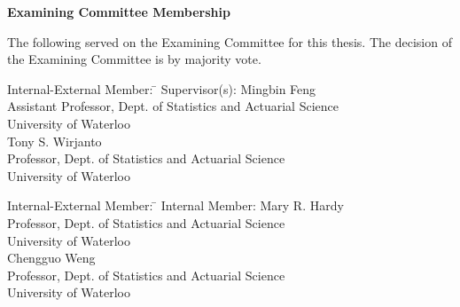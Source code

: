 \cleardoublepage %

 
\begin{center}\textbf{Examining Committee Membership}\end{center}
  \noindent
The following served on the Examining Committee for this thesis. The decision of the Examining Committee is by majority vote.
  \bigskip
  
  
  \noindent
\begin{tabbing}
Internal-External Member: \=  \kill %
Supervisor(s): \> Mingbin Feng \\
\> Assistant Professor, Dept. of Statistics and Actuarial Science\\
\> University of Waterloo \\[1cm]
\> Tony S. Wirjanto \\
\> Professor, Dept. of Statistics and Actuarial Science \\
\> University of Waterloo \\
\end{tabbing}
  \bigskip
  
  \noindent
  \begin{tabbing}
Internal-External Member: \=  \kill %
Internal Member: \> Mary R. Hardy \\
\> Professor, Dept. of Statistics and Actuarial Science \\
\> University of Waterloo\\[1cm]
\> Chengguo Weng \\
\> Professor, Dept. of Statistics and Actuarial Science \\
\> University of Waterloo \\
\end{tabbing}
  \bigskip
  
